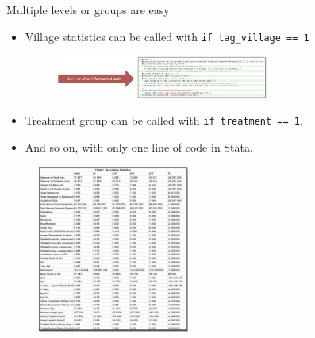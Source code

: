 \documentclass[aspectratio=169]{beamer}
\begin{document}
\begin{frame}{Multiple levels or groups are easy}
	\begin{multicols}{2}	
		
		\begin{itemize}[<default overlay specification>]
			\item<1> Village statistics can be called with \texttt{if tag\_village == 1}
			
			\begin{figure}
				\centering
				\includegraphics[width=70mm]{img/Table6}
			\end{figure}
			
			\item<1> Treatment group can be called with \texttt{if treatment == 1}.
			\item<1> And so on, with only one line of code in Stata.
		\end{itemize}
		
		\begin{figure}
			\centering
			\includegraphics[width=50mm]{img/Table7}
		\end{figure}
		
	\end{multicols}
\end{frame}
\end{document}
